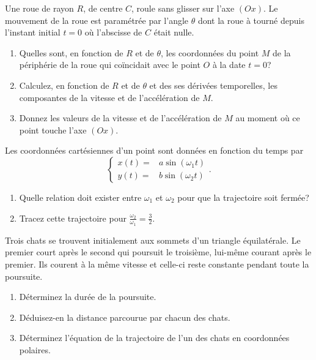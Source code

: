 \begin{exercice}%
  Une roue de rayon \(R\), de centre \(C\), roule sans glisser sur l'axe 
  \((Ox)\). Le mouvement de la roue est paramétrée par l'angle \(\theta\) dont 
  la roue à tourné depuis l'instant initial \(t=0\) où l'abscisse de \(C\) 
  était nulle.
  \begin{enumerate}%
  \item Quelles sont, en fonction de \(R\) et de \(\theta\), les coordonnées du 
    point \(M\) de la périphérie de la roue qui coïncidait avec le point \(O\) 
      à la date \(t=0\)?
  \item Calculez, en fonction de \(R\) et de \(\theta\) et des ses dérivées 
    temporelles, les composantes de la vitesse et de l'accélération de \(M\).
  \item Donnez les valeurs de la vitesse et de l'accélération de \(M\) au 
    moment où ce point touche l'axe \((Ox)\).
  \end{enumerate}%
\end{exercice}%
%
\begin{exercice}%
  Les coordonnées cartésiennes d'un point sont données en fonction du temps par
  \begin{equation}%
    \begin{cases}%
      x(t)=&a\sin(\omega_1 t)\\
      y(t)=&b\sin(\omega_2 t)
    \end{cases}.%
  \end{equation}%
  \begin{enumerate}%
  \item Quelle relation doit exister entre \(\omega_1\) et \(\omega_2\) pour 
    que la trajectoire soit fermée?
  \item Tracez cette trajectoire pour 
    \(\frac{\omega_2}{\omega_1}=\frac{3}{2}\).
  \end{enumerate}%
\end{exercice}%
%
\begin{exercice}%
  Trois chats se trouvent initialement aux sommets d'un triangle équilatérale. 
  Le premier court après le second qui poursuit le troisième, lui-même courant 
  après le premier. Ils courent à la même vitesse et celle-ci reste constante 
  pendant toute la poursuite.
  \begin{enumerate}%
  \item Déterminez la durée de la poursuite.
  \item Déduisez-en la distance parcourue par chacun des chats.
  \item Déterminez l'équation de la trajectoire de l'un des chats en 
    coordonnées polaires.
  \end{enumerate}%
\end{exercice}%
